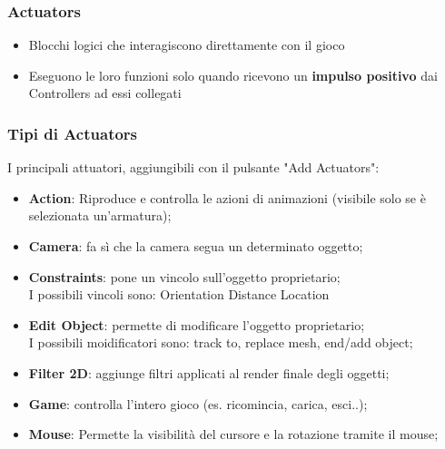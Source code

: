 \documentclass{beamer}
\begin{document}
		
		\begin{frame}
			\frametitle{Actuators} %
			\begin{itemize}
				\item Blocchi logici che interagiscono direttamente con il gioco
				\item Eseguono le loro funzioni solo quando ricevono un \textbf{impulso positivo} dai Controllers ad essi collegati
			\end{itemize}
		\end{frame}			
		\begin{frame}
			\frametitle{Tipi di Actuators}
			I principali attuatori, aggiungibili con il pulsante "Add Actuators":
			\begin{itemize}
				\item \textbf{Action}: {\footnotesize Riproduce e controlla le azioni di animazioni (visibile solo se è selezionata un'armatura);} %
				\item \textbf{Camera}: {\footnotesize fa sì che la camera segua un determinato oggetto;}
				\item \textbf{Constraints}: {\footnotesize  pone un vincolo sull’oggetto proprietario; \\I possibili vincoli sono: Orientation Distance Location}
				\item \textbf{Edit Object}: {\footnotesize permette di modificare l'oggetto proprietario; \\I possibili moidificatori sono: track to, replace mesh, end/add object;}
				\item \textbf{Filter 2D}: {\footnotesize aggiunge filtri applicati al render finale degli oggetti;}
				\item \textbf{Game}: {\footnotesize controlla l'intero gioco (es. ricomincia, carica, esci..);}
				\item \textbf{Mouse}: {\footnotesize Permette la visibilità del cursore e la rotazione tramite il mouse;}
			\end{itemize}
		\end{frame}
\end{document}
